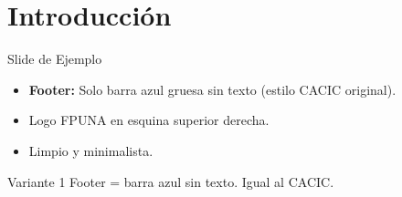 \documentclass[12pt, aspectratio=169]{beamer}
\begin{document}
\section{Introducci\'on}
\begin{frame}{Slide de Ejemplo}
\begin{itemize}
  \item \textbf{Footer:} Solo barra azul gruesa sin texto (estilo CACIC original).
  \item Logo FPUNA en esquina superior derecha.
  \item Limpio y minimalista.
\end{itemize}
\begin{block}{Variante 1}
  Footer = barra azul sin texto. Igual al CACIC.
\end{block}
\end{frame}
\end{document}
